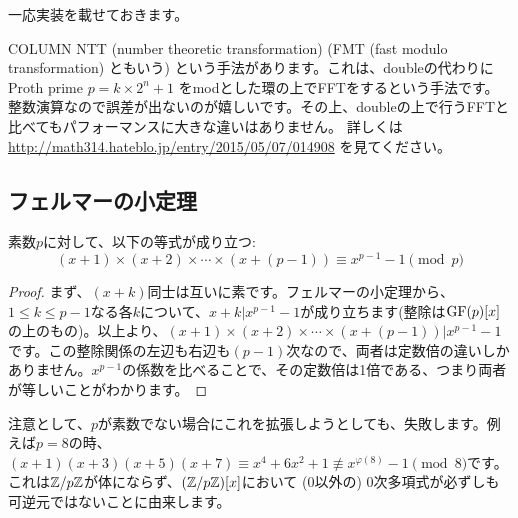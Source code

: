 \documentclass{jsarticle}
\begin{document}
  一応実装を載せておきます。
  

  \begin{itembox}[l]{COLUMN}
   NTT (number theoretic transformation) (FMT (fast modulo transformation) ともいう) という手法があります。これは、doubleの代わりに Proth prime $p = k \times 2^n + 1$ をmodとした環の上でFFTをするという手法です。
   整数演算なので誤差が出ないのが嬉しいです。その上、doubleの上で行うFFTと比べてもパフォーマンスに大きな違いはありません。
   詳しくは\url{http://math314.hateblo.jp/entry/2015/05/07/014908} を見てください。
  \end{itembox}
  \subsection{フェルマーの小定理~}
  \begin{theorem}
   \label{thm:polynomial-fermat}
   素数$p$に対して、以下の等式が成り立つ:
   \begin{displaymath}
    (x+1) \times (x+2) \times \cdots \times (x + (p - 1)) \equiv x^{p-1} - 1 \pmod p
   \end{displaymath}
  \end{theorem}
  \begin{proof}
  まず、$(x+k)$同士は互いに素です。フェルマーの小定理から、$1 \le k \le p - 1$なる各$k$について、$x + k | x^{p-1} - 1$が成り立ちます(整除は$\mathrm{GF}(p)[x]$の上のもの)。以上より、$(x+1) \times (x+2) \times \cdots \times (x + (p - 1)) | x^{p-1}-1$です。この整除関係の左辺も右辺も$(p-1)$次なので、両者は定数倍の違いしかありません。$x^{p-1}$の係数を比べることで、その定数倍は1倍である、つまり両者が等しいことがわかります。
  \end{proof}
  注意として、$p$が素数でない場合にこれを拡張しようとしても、失敗します。例えば$p=8$の時、$(x+1)(x+3)(x+5)(x+7) \equiv x^4 + 6x^2 + 1 \not \equiv x^{\varphi(8)}-1 \pmod 8$です。これは$\mathbb{Z}/p\mathbb{Z}$が体にならず、$(\mathbb{Z}/p\mathbb{Z})[x]$において (0以外の) 0次多項式が必ずしも可逆元ではないことに由来します。
\end{document}
